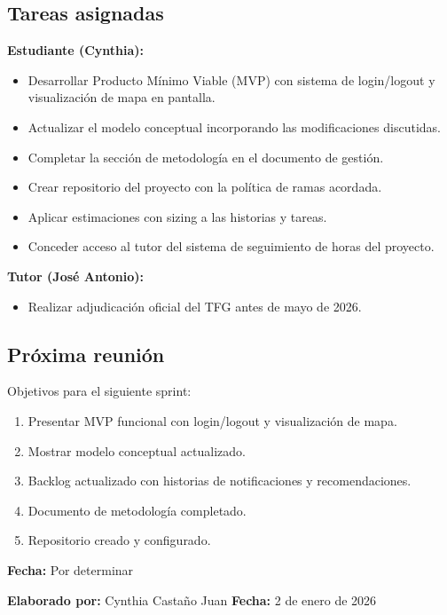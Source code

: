 \subsection*{Tareas asignadas}

\textbf{Estudiante (Cynthia):}
\begin{itemize}
    \item Desarrollar Producto Mínimo Viable (MVP) con sistema de login/logout y visualización de mapa en pantalla.
    \item Actualizar el modelo conceptual incorporando las modificaciones discutidas.
    \item Completar la sección de metodología en el documento de gestión.
    \item Crear repositorio del proyecto con la política de ramas acordada.
    \item Aplicar estimaciones con sizing a las historias y tareas.
    \item Conceder acceso al tutor del sistema de seguimiento de horas del proyecto.
\end{itemize}

\textbf{Tutor (José Antonio):}
\begin{itemize}
    \item Realizar adjudicación oficial del TFG antes de mayo de 2026.
\end{itemize}

\subsection*{Próxima reunión}

Objetivos para el siguiente sprint:

\begin{enumerate}
    \item Presentar MVP funcional con login/logout y visualización de mapa.
    \item Mostrar modelo conceptual actualizado.
    \item Backlog actualizado con historias de notificaciones y recomendaciones.
    \item Documento de metodología completado.
    \item Repositorio creado y configurado.
\end{enumerate}

\textbf{Fecha:} Por determinar

\textbf{Elaborado por:} Cynthia Castaño Juan \hfill \textbf{Fecha:} 2 de enero de 2026

